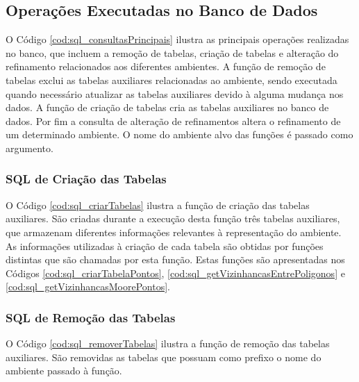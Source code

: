 \newpage

\subsection{Operações Executadas no Banco de Dados}

O Código \ref{cod:sql_consultasPrincipais} ilustra as principais operações realizadas no banco, que incluem a remoção de tabelas, criação de tabelas e alteração do refinamento relacionados aos diferentes ambientes. A função de remoção de tabelas exclui as tabelas auxiliares relacionadas ao ambiente, sendo executada quando necessário atualizar as tabelas auxiliares devido à alguma mudança nos dados. A função de criação de tabelas cria as tabelas auxiliares no banco de dados. Por fim a consulta de alteração de refinamentos altera o refinamento de um determinado ambiente. O nome do ambiente alvo das funções é passado como argumento.



\subsubsection{SQL de Criação das Tabelas}

O Código \ref{cod:sql_criarTabelas} ilustra a função de criação das tabelas auxiliares. São criadas durante a execução desta função três tabelas auxiliares, que armazenam diferentes informações relevantes à representação do ambiente. As informações utilizadas à criação de cada tabela são obtidas por funções distintas que são chamadas por esta função. Estas funções são apresentadas nos Códigos \ref{cod:sql_criarTabelaPontos}, \ref{cod:sql_getVizinhancasEntrePoligonos} e \ref{cod:sql_getVizinhancasMoorePontos}.



\subsubsection{SQL de Remoção das Tabelas}

O Código \ref{cod:sql_removerTabelas} ilustra a função de remoção das tabelas auxiliares. São removidas as tabelas que possuam como prefixo o nome do ambiente passado à função. 

